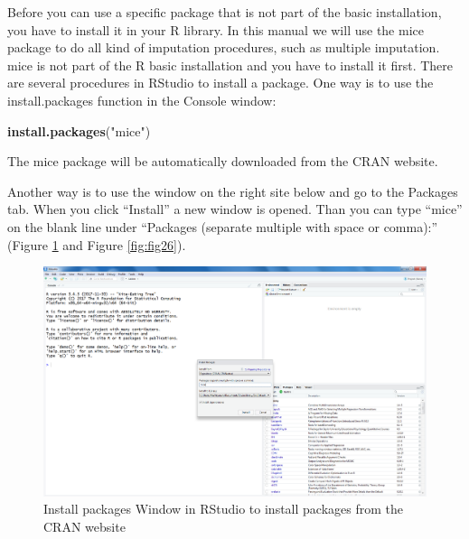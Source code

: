 \documentclass[]{book}
\newenvironment{Shaded}{\begin{snugshade}}{\end{snugshade}}
\newcommand{\KeywordTok}[1]{\textcolor[rgb]{0.13,0.29,0.53}{\textbf{#1}}}
\newcommand{\StringTok}[1]{\textcolor[rgb]{0.31,0.60,0.02}{#1}}
\newcommand{\NormalTok}[1]{#1}
\begin{document}
Before you can use a specific package that is not part of the basic
installation, you have to install it in your R library. In this manual
we will use the mice package to do all kind of imputation procedures,
such as multiple imputation. mice is not part of the R basic
installation and you have to install it first. There are several
procedures in RStudio to install a package. One way is to use the
install.packages function in the Console window:

\begin{Shaded}
\begin{Highlighting}[]
\KeywordTok{install.packages}\NormalTok{(}\StringTok{"mice"}\NormalTok{)}
\end{Highlighting}
\end{Shaded}

The mice package will be automatically downloaded from the CRAN website.

Another way is to use the window on the right site below and go to the
Packages tab. When you click ``Install'' a new window is opened. Than
you can type ``mice'' on the blank line under ``Packages (separate
multiple with space or comma):'' (Figure \ref{fig:fig25} and Figure
\ref{fig:fig26}).

\begin{figure}

{\centering \includegraphics[width=0.95\linewidth]{images/fig1.25a} 

}

\caption{Install packages Window in RStudio to install packages from the CRAN website}\label{fig:fig25}
\end{figure}
\end{document}
